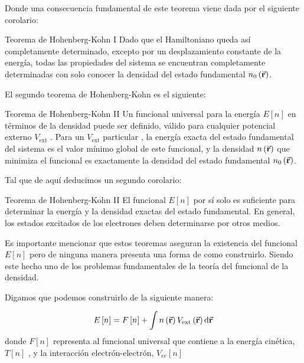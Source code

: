  Donde una consecuencia fundamental de este teorema viene dada por el siguiente corolario:

  \begin{mycoro}{Teorema de Hohenberg-Kohn I}{}
    Dado que el Hamiltoniano queda así completamente determinado, excepto por un desplazamiento constante de la energía, todas las propiedades del sistema se encuentran completamente determinadas con solo conocer la densidad del estado fundamental $n_0 \left( \va{r} \right)$.
\end{mycoro}

El segundo teorema de Hohenberg-Kohn es el siguiente:


\begin{mytheo}{Teorema de Hohenberg-Kohn II}{}
    Un funcional universal para la energía $E \left[ n \right]$ en términos de la densidad puede ser definido, válido para cualquier potencial externo $V_{\text{ext}}$ . Para un  $V_{\text{ext}}$ particular , la energía exacta del estado fundamental del sistema es el valor mínimo global de este funcional, y la densidad $n \left( \va{r} \right)$ que minimiza el funcional es exactamente la densidad del estado fundamental $n_0 \left( \va{r} \right)$.
\end{mytheo}

Tal que de aquí deducimos un segundo corolario:

\begin{mycoro}{Teorema de Hohenberg-Kohn II}{}
    El funcional $E \left[ n \right]$ por sí solo es suficiente para determinar la energía y la densidad exactas del estado fundamental. En general, los estados excitados de los electrones deben determinarse por otros medios.
\end{mycoro}

Es importante mencionar que estos teoremas aseguran la existencia del funcional $E \left[ n \right]$ pero de ninguna manera presenta una forma de como construirlo. Siendo este hecho uno de los problemas fundamentales de la teoría del funcional de la densidad.

Digamos que podemos construirlo de la siguiente manera: 

\begin{equation}
    E \left[ n \right] = F \left[ n \right] + \int n \left( \va{r} \right) V_{\text{ext}} \left( \va{r} \right) \dd{\va{r}}
\end{equation} donde $F \left[ n \right]$ representa al funcional universal que contiene a la energía cinética, $ T \left[ n \right] $ , y la interacción electrón-electrón,  $ V_{ee} \left[ n \right] $


